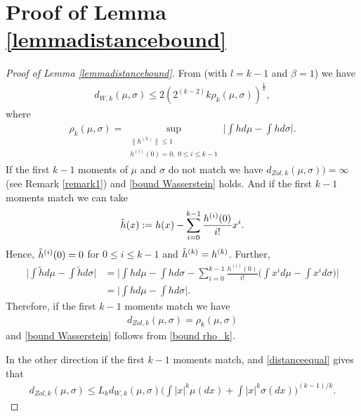 \documentclass[11pt,letterpaper,reqno]{article}
\theoremstyle{thmstyleone}%
\theoremstyle{thmstyletwo}%
\theoremstyle{thmstylethree}%
\numberwithin{equation}{section}
\begin{document}
\section{Proof of Lemma \ref{lemmadistancebound}}\label{app:c}
\begin{proof}[Proof of Lemma \ref{lemmadistancebound}]
From \cite[Remark 1]{HB} (with $l=k-1$ and $\beta=1$) we have 
\begin{align}\label{bound rho_k}
     d_{W,k}(\mu, \sigma) \leq 2(2^{(k-2)}k\rho_k(\mu, \sigma))^{\frac{1}{k}},
\end{align}
where
\begin{align*}
   \rho_k (\mu,\sigma)=\sup_{\substack{\|h^{(k)}\| \leq 1 \\ h^{(i)}(0)=0,\; 0 \leq i \leq k-1}} \bigg|\int h d\mu-\int h d\sigma\bigg|.
\end{align*}
If the first $k-1$ moments of $\mu$ and $\sigma$ do not match we have $d_{Zol,k}(\mu, \sigma))=\infty$ (see Remark \ref{remark1}) and \eqref{bound Wasserstein} holds. And if the first $k-1$ moments match we can take 
\begin{align*}
    \Tilde{h}(x):=h(x)-\sum_{i=0}^{k-1}\frac{h^{(i)}(0)}{i!}x^i.
\end{align*}
Hence, $\Tilde{h}^{(i)}(0)=0$ for $0 \leq i \leq k-1$ and $\Tilde{h}^{(k)}=h^{(k)}$. Further,
\begin{align*}
   \bigg|\int \tilde{h} d\mu-\int \tilde {h} d\sigma\bigg|&=\bigg|\int h d\mu-\int h d\sigma-\sum_{i=0}^{k-1}\frac{h^{(i)}(0)}{i!}\bigg(\int x^id \mu-\int x^i d\sigma\bigg) \bigg|\\
    &=\bigg|\int h d\mu-\int h d\sigma\bigg|.
\end{align*}
Therefore, if the first $k-1$ moments match we have 
\begin{align}\label{distanceequal}
    d_{Zol,k}(\mu, \sigma)=\rho_k (\mu,\sigma)
\end{align}
and \eqref{bound Wasserstein} follows from \eqref{bound rho_k}.

In the other direction if the first $k-1$ moments match, \cite{BDS} and \eqref{distanceequal} gives that
\begin{align}
    d_{Zol,k}(\mu,\sigma) \leq L_k d_{W,k}(\mu, \sigma)\bigg(\int |x|^k \mu(dx) +\int |x|^k \sigma(dx)\bigg)^{(k-1)/k}.
\end{align}
\end{proof}
\end{document}

